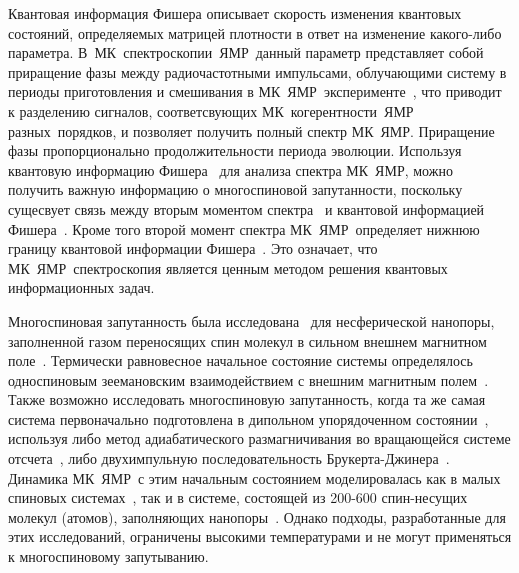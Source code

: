 \documentclass[utf8]{jetp}
\begin{document}
Квантовая информация Фишера описывает скорость изменения квантовых состояний,
определяемых матрицей плотности в ответ на изменение какого-либо параметра.
В~МК~спектроскопии~ЯМР~данный параметр представляет собой приращение фазы между радиочастотными импульсами,
облучающими систему в периоды приготовления и смешивания в МК~ЯМР~эксперименте~\cite{Baum_1985},
что приводит к разделению сигналов, соответсвующих МК~когерентности~ЯМР разных~порядков,
и позволяет получить полный спектр МК~ЯМР.
Приращение фазы пропорционально продолжительности периода эволюции.
Используя квантовую информацию Фишера~\cite{Liu_2014} для анализа спектра МК~ЯМР,
можно получить важную информацию о многоспиновой запутанности,
поскольку сущесвует связь между вторым моментом спектра~\cite{Khitrin_1997} и квантовой информацией Фишера~\cite{G_rttner_2018,Doronin_2019}.
Кроме того второй момент спектра МК~ЯМР~определяет нижнюю границу квантовой информации Фишера~\cite{G_rttner_2018}.
Это означает, что МК~ЯМР~спектроскопия является ценным методом решения квантовых информационных задач.

Многоспиновая запутанность была исследована~\cite{Doronin_2019} для несферической нанопоры,
заполненной газом переносящих спин молекул в сильном внешнем магнитном поле~\cite{Baugh_2001,Doronin_2009}.
Термически равновесное начальное состояние системы определялось односпиновым зеемановским взаимодействием с внешним магнитным полем~\cite{Doronin_2007a}.
Также возможно исследовать многоспиновую запутанность,
когда та же самая система первоначально подготовлена в дипольном упорядоченном состоянии~\cite{Goldman_1970},
используя либо метод адиабатического размагничивания во вращающейся системе отсчета~\cite{Goldman_1970, Slichter_1961},
либо двухимпульную последовательность Брукерта-Джинера~\cite{Goldman_1970, Jeener_1967}.
Динамика МК~ЯМР~с этим начальным состоянием моделировалась как в малых спиновых системах~\cite{Doronin_2007a, Doronin_2007b},
так и в системе, состоящей из 200-600 спин-несущих молекул (атомов), заполняющих нанопоры~\cite{Doronin_2011}.
Однако подходы, разработанные для этих исследований, ограничены высокими температурами и не могут применяться к многоспиновому запутыванию.
\end{document}
